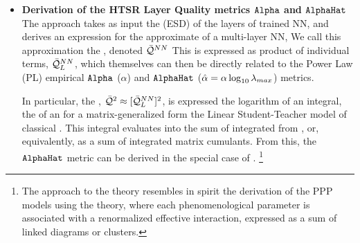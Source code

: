 \begin{itemize}
\item
  \textbf{Derivation of the HTSR Layer Quality metrics $\texttt{Alpha}$ and  $\texttt{AlphaHat}$}
  The \SETOL approach takes as input the
  \EmpiricalSpectralDensity (ESD) of the layers
  of trained NN, and  derives an expression for the approximate \emph{\AverageGeneralizationAccuracy}
  of a multi-layer NN, We call this approximation the \emph{\ModelQuality}, denoted $\bar{\mathcal{Q}}^{NN}$
  This \ModelQuality is  expressed as product of individual \LayerQuality terms, $\bar{\mathcal{Q}}^{NN}_{L}$,
  which themselves can  then 
  be directly related to the \HTSR Power Law (PL) empirical $\texttt{Alpha}$ ($\alpha$)
  and $\texttt{AlphaHat}$  ($\hat\alpha=\alpha\log_{10}\lambda_{max}$) metrics.

  In particular, the \LayerQualitySquared, $\bar{\mathcal{Q}}^{2}\approx[\bar{\mathcal{Q}}^{NN}_{L}]^{2}$, is
  expressed the logarithm of an \HCIZtext integral, the \ThermalAverage of an \EffectivePotential
  for a matrix-generalized form the Linear Student-Teacher model of classical \STATMECH. This \HCIZtext
  integral evaluates into the sum of integrated \RTransforms
  from \RMT, or, equivalently, as a sum of integrated matrix cumulants.
  From this, the \HTSR $\texttt{AlphaHat}$ metric can be derived in the special case of \IdealLearning.
  \footnote{The \SETOL approach to the \HTSR theory resembles
  in spirit the derivation of the \SemiEmpirical PPP models using
  the \EffectiveHamiltonian theory, where each phenomenological parameter is associated with a renormalized
  effective interaction, expressed as a sum of linked diagrams or clusters.\cite{Martin1996, Martin1998}}


\end{itemize}
